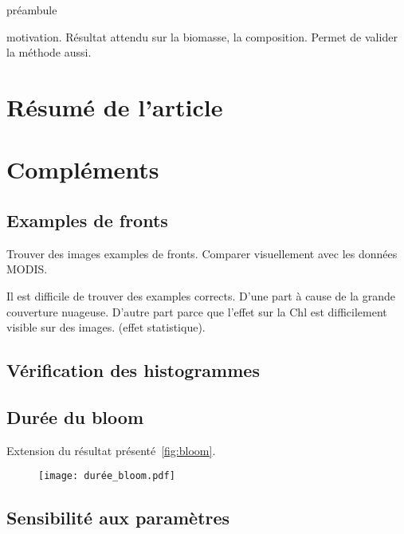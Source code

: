 
\label{chp:res-chl}
\graphicspath{{resources/res_chl}}

\minitoc%
\clearpage

préambule

motivation.
Résultat attendu sur la biomasse, la composition.
Permet de valider la méthode aussi.

\section{Résumé de l'article}
\label{sec:resume-article}

\insertArticle{}

\section{Compléments}
\label{sec:complements-chl}

\subsection{Examples de fronts}
\label{sec:examples-fronts}

Trouver des images examples de fronts.
Comparer visuellement avec les données MODIS\@.

Il est difficile de trouver des examples corrects.
D'une part à cause de la grande couverture nuageuse.
D'autre part parce que l'effet sur la Chl est difficilement visible sur des images. (effet statistique).

\subsection{Vérification des histogrammes}

\subsection{Durée du bloom}
\label{sec:duree-bloom}

Extension du résultat présenté~\cref{fig:bloom}.

\begin{figure}
  \centering
  \texttt{[image: durée\_bloom.pdf]}
  \label{fig:duree-bloom}
\end{figure}

\subsection{Sensibilité aux paramètres}
\label{sec:sensibilite-parametres}

